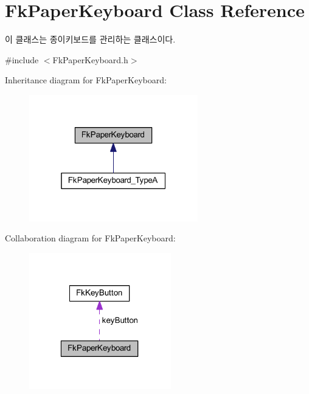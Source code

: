 \hypertarget{class_fk_paper_keyboard}{}\section{Fk\+Paper\+Keyboard Class Reference}
\label{class_fk_paper_keyboard}


이 클래스는 종이키보드를 관리하는 클래스이다.  




{\ttfamily \#include $<$Fk\+Paper\+Keyboard.\+h$>$}



Inheritance diagram for Fk\+Paper\+Keyboard\+:
\nopagebreak
\begin{figure}[H]
\begin{center}
\leavevmode
\includegraphics[width=208pt]{class_fk_paper_keyboard__inherit__graph}
\end{center}
\end{figure}


Collaboration diagram for Fk\+Paper\+Keyboard\+:
\nopagebreak
\begin{figure}[H]
\begin{center}
\leavevmode
\includegraphics[width=175pt]{class_fk_paper_keyboard__coll__graph}
\end{center}
\end{figure}
